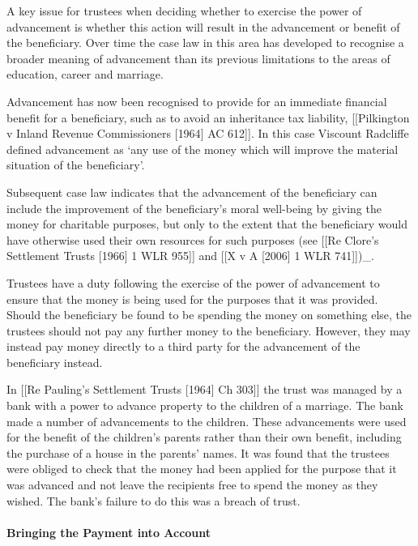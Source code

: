 \documentclass[
]{article}
\begin{document}
A key issue for trustees when deciding whether to exercise the power of
advancement is whether this action will result in the advancement or
benefit of the beneficiary. Over time the case law in this area has
developed to recognise a broader meaning of advancement than its
previous limitations to the areas of education, career and marriage.

Advancement has now been recognised to provide for an immediate
financial benefit for a beneficiary, such as to avoid an inheritance tax
liability, {[}{[}Pilkington v Inland Revenue Commissioners {[}1964{]} AC
612{]}{]}. In this case Viscount Radcliffe defined advancement as `any
use of the money which will improve the material situation of the
beneficiary'.

Subsequent case law indicates that the advancement of the beneficiary
can include the improvement of the beneficiary's moral well-being by
giving the money for charitable purposes, but only to the extent that
the beneficiary would have otherwise used their own resources for such
purposes (see {[}{[}Re Clore's Settlement Trusts {[}1966{]} 1 WLR
955{]}{]} and {[}{[}X v A {[}2006{]} 1 WLR 741{]}{]})\_.

Trustees have a duty following the exercise of the power of advancement
to ensure that the money is being used for the purposes that it was
provided. Should the beneficiary be found to be spending the money on
something else, the trustees should not pay any further money to the
beneficiary. However, they may instead pay money directly to a third
party for the advancement of the beneficiary instead.

In {[}{[}Re Pauling's Settlement Trusts {[}1964{]} Ch 303{]}{]} the
trust was managed by a bank with a power to advance property to the
children of a marriage. The bank made a number of advancements to the
children. These advancements were used for the benefit of the children's
parents rather than their own benefit, including the purchase of a house
in the parents' names. It was found that the trustees were obliged to
check that the money had been applied for the purpose that it was
advanced and not leave the recipients free to spend the money as they
wished. The bank's failure to do this was a breach of trust.

\hypertarget{bringing-the-payment-into-account}{%
\paragraph{Bringing the Payment into
Account}\label{bringing-the-payment-into-account}}
\end{document}
